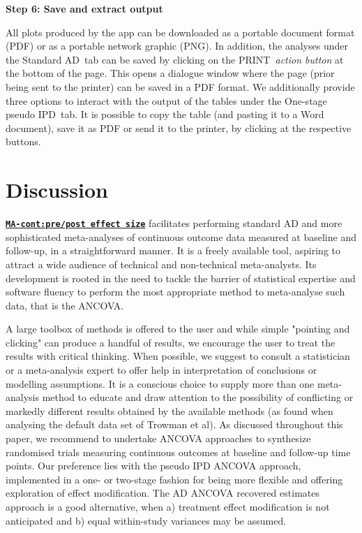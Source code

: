 \documentclass[AMA,STIX1COL]{WileyNJD-v2}
\begin{document}
\vspace{0.1cm}

\textbf{Step 6: Save and extract output}
\vspace{0.1cm}

All plots produced by the app can be downloaded as a portable document format (PDF) or as a portable network graphic (PNG). In addition, the analyses under the \textquotesingle Standard AD\textquotesingle\ tab can be saved by clicking on the \textquotesingle PRINT\textquotesingle\ \textit{action button} at the bottom of the page. This opens a dialogue window where the page (prior being sent to the printer) can be saved in a PDF format. We additionally provide three options to interact with the output of the tables under the \textquotesingle One-stage pseudo IPD\textquotesingle\ tab. It is possible to copy the table (and pasting it to a Word document), save it as PDF or send it to the printer, by clicking at the respective buttons. 

\section{Discussion}

\href{https://katerina-pap.shinyapps.io/MA-cont-prepostES/}{\textbf{\texttt{MA-cont:pre/post effect size}}} facilitates performing standard AD and more sophisticated meta-analyses of continuous outcome data measured at baseline and follow-up, in a straightforward manner. It is a freely available tool, aspiring to attract a wide audience of technical and non-technical meta-analysts. Its development is rooted in the need to tackle the barrier of statistical expertise and software fluency to perform the most appropriate method to meta-analyse such data, that is the ANCOVA.

A large toolbox of methods is offered to the user and while simple "pointing and clicking" can produce a handful of results, we encourage the user to treat the results with critical thinking. When possible, we suggest to consult a statistician or a meta-analysis expert to offer help in interpretation of conclusions or modelling assumptions. It is a conscious choice to supply more than one meta-analysis method to educate and draw attention to the possibility of conflicting or markedly different results obtained by the available methods (as found when analysing the default data set of Trowman et al\cite{trowman2007impact}). As discussed throughout this paper, we recommend to undertake ANCOVA approaches to synthesize randomised trials measuring continuous outcomes at baseline and follow-up time points. Our preference lies with the pseudo IPD ANCOVA approach, implemented in a one- or two-stage fashion for being more flexible and offering exploration of effect modification. The AD ANCOVA recovered estimates approach is a good alternative, when a) treatment effect modification is not anticipated and b) equal within-study variances may be assumed.
\end{document}
